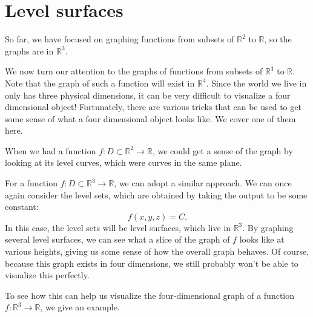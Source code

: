 \documentclass{ximera}
\begin{document}
\begin{example}
\begin{multipleChoice}
\end{multipleChoice}

\end{example}

\section*{Level surfaces}

So far, we have focused on graphing functions from subsets of $\mathbb{R}^2$ to $\mathbb{R}$, so the graphs are in $\mathbb{R}^3$.

We now turn our attention to the graphs of functions from subsets of $\mathbb{R}^3$ to $\mathbb{R}$. Note that the graph of such a function will exist in $\mathbb{R}^4$. Since the world we live in only has three physical dimensions, it can be very difficult to visualize a four dimensional object! Fortunately, there are various tricks that can be used to get some sense of what a four dimensional object looks like. We cover one of them here.

When we had a function $f:D\subset\mathbb{R}^2\rightarrow\mathbb{R}$, we could get a sense of the graph by looking at its level curves, which were curves in the same plane.

For a function $f:D\subset\mathbb{R}^3\rightarrow\mathbb{R}$, we can adopt a similar approach. We can once again consider the level sets, which are obtained by taking the output to be some constant:
\[
f(x,y,z) = C.
\]
In this case, the level sets will be level surfaces, which live in $\mathbb{R}^3$. By graphing several level surfaces, we can see what a slice of the graph of $f$ looks like at various heights, giving us some sense of how the overall graph behaves. Of course, because this graph exists in four dimensions, we still probably won't be able to visualize this perfectly.

To see how this can help us visualize the four-dimensional graph of a function $f:\mathbb{R}^3\rightarrow\mathbb{R}$, we give an example.
\end{document}
